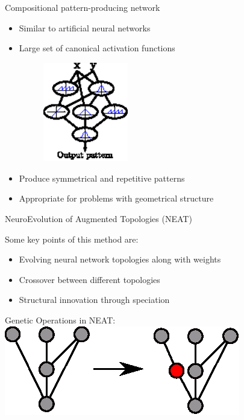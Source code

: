 \documentclass[6pt]{beamer}
\begin{document}
\begin{frame}{Compositional pattern-producing network~}
\begin{itemize}
\item Similar to artificial neural networks
\item Large set of canonical activation functions
\begin{figure}
\begin{center}
\includegraphics[width=0.35\textwidth]{../Figures/Misc/cppnNetwork.eps}
\end{center}
\end{figure}
\item Produce symmetrical and repetitive patterns
\item Appropriate for problems with geometrical structure
\end{itemize}
\end{frame}

\begin{frame}{NeuroEvolution of Augmented Topologies (NEAT)~}
\begin{block}{Some key points of this method are:}
\begin{itemize}
\item Evolving neural network topologies along with weights
\item Crossover between different topologies
\item Structural innovation through speciation
\end{itemize}
\end{block}
\begin{block}{Genetic Operations in NEAT:}
\centering
\includegraphics[height=0.25\textheight]{../Figures/Misc/neatAddNode.eps}
\end{block}
\end{frame}
\end{document}
